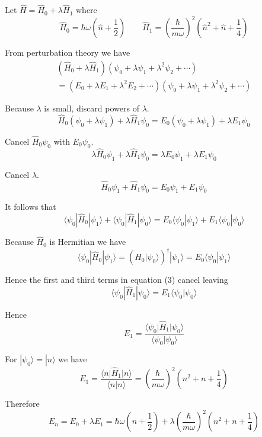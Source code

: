\documentclass[12pt]{article}
\begin{document}
Let $\hat H=\hat H_0+\lambda\hat H_1$ where
\begin{equation*}
\hat H_0=\hbar\omega\left(\hat n+\frac{1}{2}\right)
\qquad
\hat H_1=\left(\frac{\hbar}{m\omega}\right)^2\left(\hat n^2+\hat n+\frac{1}{4}\right)
\end{equation*}

From perturbation theory we have
\begin{multline*}
\left(\hat H_0+\lambda\hat H_1\right)\left(\psi_0+\lambda\psi_1+\lambda^2\psi_2+\cdots\right)
\\
=\left(E_0+\lambda E_1+\lambda^2 E_2+\cdots\right)\left(\psi_0+\lambda\psi_1+\lambda^2\psi_2+\cdots\right)
\end{multline*}

Because $\lambda$ is small, discard powers of $\lambda$.
\begin{equation*}
\hat H_0(\psi_0+\lambda\psi_1)+\lambda \hat H_1\psi_0=E_0(\psi_0+\lambda\psi_1)+\lambda E_1\psi_0
\end{equation*}

Cancel $\hat H_0\psi_0$ with $E_0\psi_0$.
\begin{equation*}
\lambda\hat H_0\psi_1+\lambda \hat H_1\psi_0=\lambda E_0\psi_1+\lambda E_1\psi_0
\end{equation*}

Cancel $\lambda$.
\begin{equation*}
\hat H_0\psi_1+\hat H_1\psi_0=E_0\psi_1+E_1\psi_0
\end{equation*}

It follows that
\begin{equation*}
\langle\psi_0|\hat H_0|\psi_1\rangle
+\langle\psi_0|\hat H_1|\psi_0\rangle
=E_0\langle\psi_0|\psi_1\rangle
+E_1\langle\psi_0|\psi_0\rangle
\tag{3}
\end{equation*}

Because $\hat H_0$ is Hermitian we have
\begin{equation*}
\langle\psi_0|\hat H_0|\psi_1\rangle=\left(\hat H_0|\psi_0\rangle\right)^\dag|\psi_1\rangle
=E_0\langle\psi_0|\psi_1\rangle
\end{equation*}

Hence the first and third terms in equation (3) cancel leaving
\begin{equation*}
\langle\psi_0|\hat H_1|\psi_0\rangle
=E_1\langle\psi_0|\psi_0\rangle
\end{equation*}

Hence
\begin{equation*}
E_1=\frac{\langle\psi_0\vert\hat H_1\vert\psi_0\rangle}{\langle\psi_0\vert\psi_0\rangle}
\end{equation*}

For $|\psi_0\rangle=|n\rangle$ we have
\begin{equation*}
E_1=\frac{\langle n\vert\hat H_1\vert n\rangle}{\langle n\vert n\rangle}
=\left(\frac{\hbar}{m\omega}\right)^2\left(n^2+n+\frac{1}{4}\right)
\end{equation*}

Therefore
\begin{equation*}
E_n=E_0+\lambda E_1=\hbar\omega\left(n+\frac{1}{2}\right)+\lambda\left(\frac{\hbar}{m\omega}\right)^2\left(n^2+n+\frac{1}{4}\right)
\end{equation*}
\end{document}
